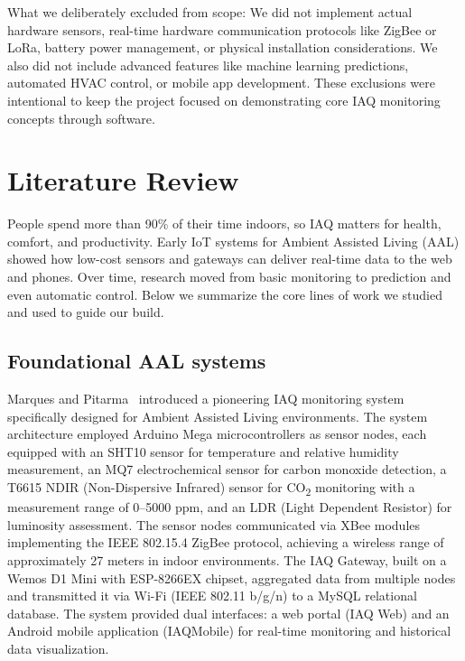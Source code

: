 \documentclass[12pt]{report}
\begin{document}
What we deliberately excluded from scope: We did not implement actual hardware sensors, real-time hardware communication protocols like ZigBee or LoRa, battery power management, or physical installation considerations. We also did not include advanced features like machine learning predictions, automated HVAC control, or mobile app development. These exclusions were intentional to keep the project focused on demonstrating core IAQ monitoring concepts through software.

\section{Literature Review}
People spend more than 90\% of their time indoors, so IAQ matters for health, comfort, and productivity. Early IoT systems for Ambient Assisted Living (AAL) showed how low-cost sensors and gateways can deliver real-time data to the web and phones. Over time, research moved from basic monitoring to prediction and even automatic control. Below we summarize the core lines of work we studied and used to guide our build.

\subsection{Foundational AAL systems}
Marques and Pitarma~\cite{marques2016} introduced a pioneering IAQ monitoring system specifically designed for Ambient Assisted Living environments. The system architecture employed Arduino Mega microcontrollers as sensor nodes, each equipped with an SHT10 sensor for temperature and relative humidity measurement, an MQ7 electrochemical sensor for carbon monoxide detection, a T6615 NDIR (Non-Dispersive Infrared) sensor for CO\textsubscript{2} monitoring with a measurement range of 0--5000 ppm, and an LDR (Light Dependent Resistor) for luminosity assessment. The sensor nodes communicated via XBee modules implementing the IEEE 802.15.4 ZigBee protocol, achieving a wireless range of approximately 27 meters in indoor environments. The IAQ Gateway, built on a Wemos D1 Mini with ESP-8266EX chipset, aggregated data from multiple nodes and transmitted it via Wi-Fi (IEEE 802.11 b/g/n) to a MySQL relational database. The system provided dual interfaces: a web portal (IAQ Web) and an Android mobile application (IAQMobile) for real-time monitoring and historical data visualization.
\end{document}
